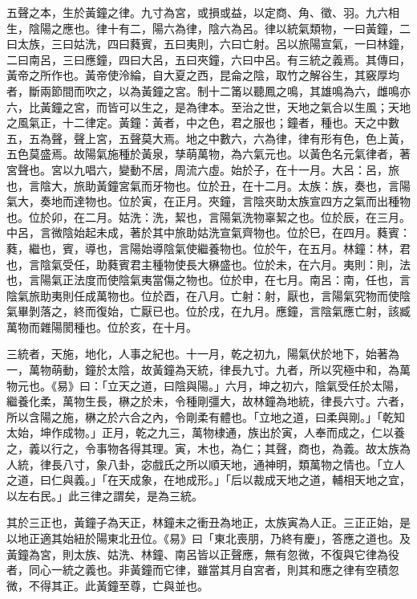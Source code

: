 \begin{pinyinscope}
五聲之本，生於黃鐘之律。九寸為宮，或損或益，以定商、角、徵、羽。九六相生，陰陽之應也。律十有二，陽六為律，陰六為呂。律以統氣類物，一曰黃鐘，二曰太族，三曰姑洗，四曰蕤賓，五曰夷則，六曰亡射。呂以旅陽宣氣，一曰林鐘，二曰南呂，三曰應鐘，四曰大呂，五曰夾鐘，六曰中呂。有三統之義焉。其傳曰，黃帝之所作也。黃帝使泠綸，自大夏之西，昆侖之陰，取竹之解谷生，其竅厚均者，斷兩節間而吹之，以為黃鐘之宮。制十二筩以聽鳳之鳴，其雄鳴為六，雌鳴亦六，比黃鐘之宮，而皆可以生之，是為律本。至治之世，天地之氣合以生風；天地之風氣正，十二律定。黃鐘：黃者，中之色，君之服也；鐘者，種也。天之中數五，五為聲，聲上宮，五聲莫大焉。地之中數六，六為律，律有形有色，色上黃，五色莫盛焉。故陽氣施種於黃泉，孳萌萬物，為六氣元也。以黃色名元氣律者，著宮聲也。宮以九唱六，變動不居，周流六虛。始於子，在十一月。大呂：呂，旅也，言陰大，旅助黃鐘宮氣而牙物也。位於丑，在十二月。太族：族，奏也，言陽氣大，奏地而達物也。位於寅，在正月。夾鐘，言陰夾助太族宣四方之氣而出種物也。位於卯，在二月。姑洗：洗，絜也，言陽氣洗物辜絜之也。位於辰，在三月。中呂，言微陰始起未成，著於其中旅助姑洗宣氣齊物也。位於巳，在四月。蕤賓：蕤，繼也，賓，導也，言陽始導陰氣使繼養物也。位於午，在五月。林鐘：林，君也，言陰氣受任，助蕤賓君主種物使長大楙盛也。位於未，在六月。夷則：則，法也，言陽氣正法度而使陰氣夷當傷之物也。位於申，在七月。南呂：南，任也，言陰氣旅助夷則任成萬物也。位於酉，在八月。亡射：射，厭也，言陽氣究物而使陰氣畢剝落之，終而復始，亡厭已也。位於戌，在九月。應鐘，言陰氣應亡射，該臧萬物而雜陽閡種也。位於亥，在十月。

三統者，天施，地化，人事之紀也。十一月，乾之初九，陽氣伏於地下，始著為一，萬物萌動，鐘於太陰，故黃鐘為天統，律長九寸。九者，所以究極中和，為萬物元也。《易》曰：「立天之道，曰陰與陽。」六月，坤之初六，陰氣受任於太陽，繼養化柔，萬物生長，楙之於未，令種剛彊大，故林鐘為地統，律長六寸。六者，所以含陽之施，楙之於六合之內，令剛柔有體也。「立地之道，曰柔與剛。」「乾知太始，坤作成物。」正月，乾之九三，萬物棣通，族出於寅，人奉而成之，仁以養之，義以行之，令事物各得其理。寅，木也，為仁；其聲，商也，為義。故太族為人統，律長八寸，象八卦，宓戲氏之所以順天地，通神明，類萬物之情也。「立人之道，曰仁與義。」「在天成象，在地成形。」「后以裁成天地之道，輔相天地之宜，以左右民。」此三律之謂矣，是為三統。

其於三正也，黃鐘子為天正，林鐘未之衝丑為地正，太族寅為人正。三正正始，是以地正適其始紐於陽東北丑位。《易》曰「東北喪朋，乃終有慶」，答應之道也。及黃鐘為宮，則太族、姑洗、林鐘、南呂皆以正聲應，無有忽微，不復與它律為役者，同心一統之義也。非黃鐘而它律，雖當其月自宮者，則其和應之律有空積忽微，不得其正。此黃鐘至尊，亡與並也。


\end{pinyinscope}
